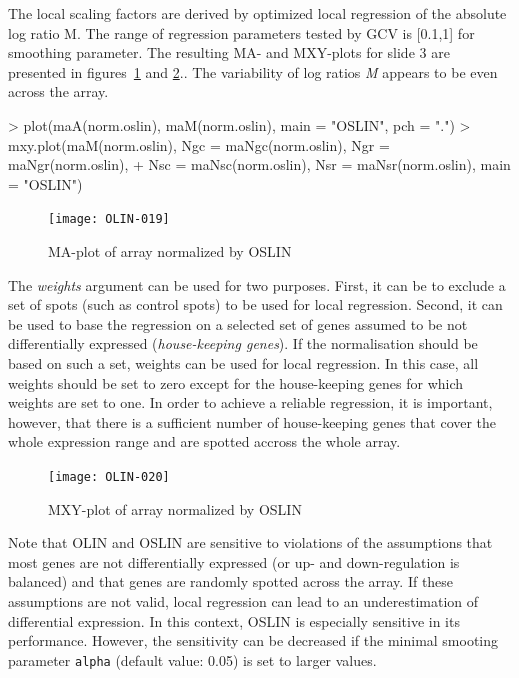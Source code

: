 \documentclass[a4paper,11pt]{article}
\begin{document}
The local scaling factors are  derived by optimized local regression of the absolute log ratio M. 
The range of regression  parameters tested by GCV is [0.1,1] for smoothing parameter. 
The resulting MA- and MXY-plots for slide 3 are presented in figures~\ref{maoslin} and \ref{mxyoslin}.. 
The variability of log ratios \emph{M} appears to be even across the array.


\begin{Schunk}
\begin{Sinput}
> plot(maA(norm.oslin), maM(norm.oslin), main = "OSLIN", pch = ".")
> mxy.plot(maM(norm.oslin), Ngc = maNgc(norm.oslin), Ngr = maNgr(norm.oslin), 
+     Nsc = maNsc(norm.oslin), Nsr = maNsr(norm.oslin), main = "OSLIN")
\end{Sinput}
\end{Schunk}



\begin{figure}[t]
\centering
\texttt{[image: OLIN-019]}
\caption{MA-plot of array normalized by  OSLIN }
\label{maoslin}
\end{figure}

The \emph{weights} argument can be used for two purposes. First, it can be 
to exclude a set of spots (such as control spots)  to be used  for local regression. Second, it can be used 
to base the regression on a selected set of genes assumed to be not differentially expressed (\emph{house-keeping
genes}).  
If the normalisation should be based on such a set, weights can be used for local regression. 
In this case, all weights should be  set to zero except for
the house-keeping genes for which weights are set to one. In order to achieve a reliable regression, it is important, however, that there is a sufficient number of house-keeping genes that  cover the whole expression range
and are spotted accross the whole array.



\begin{figure}[t]
\centering
\texttt{[image: OLIN-020]}
\caption{MXY-plot of array normalized by  OSLIN }
\label{mxyoslin}
\end{figure}

Note that OLIN and OSLIN
are sensitive to violations of the assumptions that
 most genes are not differentially expressed (or up- and down-regulation
is balanced) and that genes are randomly spotted across the array. 
If these assumptions are not valid, local
regression can lead to an underestimation of differential expression.  
In this context,  OSLIN is especially sensitive in its performance. However, the
sensitivity can be decreased if the minimal smooting parameter \texttt{alpha} (default value: 0.05)
 is set to larger values. 
 
\end{document}

